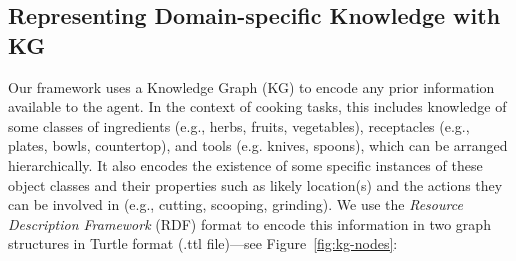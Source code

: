 \subsection{Representing Domain-specific Knowledge with KG}
\label{sec:framework-kg}
Our framework uses a Knowledge Graph (KG) to encode any prior information available to the agent. In the context of cooking tasks, this includes knowledge of some classes of ingredients (e.g., herbs, fruits, vegetables), receptacles (e.g., plates, bowls, countertop), and tools (e.g. knives, spoons), which can be arranged hierarchically. It also encodes the existence of some specific instances of these object classes and their properties such as likely location(s) and the actions they can be involved in (e.g., cutting, scooping, grinding). We use the \textit{Resource Description Framework} (RDF) format to encode this information in two graph structures in Turtle format (.ttl file)---see Figure~\ref{fig:kg-nodes}:
